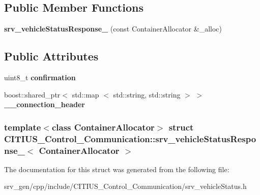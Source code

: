\subsection*{\-Public \-Member \-Functions}
\begin{DoxyCompactItemize}
\item 
\hypertarget{struct_c_i_t_i_u_s___control___communication_1_1srv__vehicle_status_response___a6d7b2470235ac1ef2182d25da1c1525e}{{\bfseries srv\-\_\-vehicle\-Status\-Response\-\_\-} (const \-Container\-Allocator \&\-\_\-alloc)}\label{struct_c_i_t_i_u_s___control___communication_1_1srv__vehicle_status_response___a6d7b2470235ac1ef2182d25da1c1525e}

\end{DoxyCompactItemize}
\subsection*{\-Public \-Attributes}
\begin{DoxyCompactItemize}
\item 
\hypertarget{struct_c_i_t_i_u_s___control___communication_1_1srv__vehicle_status_response___ae526b2adc755a8201ba4b022d015dd68}{uint8\-\_\-t {\bfseries confirmation}}\label{struct_c_i_t_i_u_s___control___communication_1_1srv__vehicle_status_response___ae526b2adc755a8201ba4b022d015dd68}

\item 
\hypertarget{struct_c_i_t_i_u_s___control___communication_1_1srv__vehicle_status_response___a3a7188e30c5cf5e28bfe2b84869b86b6}{boost\-::shared\-\_\-ptr$<$ std\-::map\*
$<$ std\-::string, std\-::string $>$ $>$ {\bfseries \-\_\-\-\_\-connection\-\_\-header}}\label{struct_c_i_t_i_u_s___control___communication_1_1srv__vehicle_status_response___a3a7188e30c5cf5e28bfe2b84869b86b6}

\end{DoxyCompactItemize}
\subsubsection*{template$<$class Container\-Allocator$>$ struct C\-I\-T\-I\-U\-S\-\_\-\-Control\-\_\-\-Communication\-::srv\-\_\-vehicle\-Status\-Response\-\_\-$<$ Container\-Allocator $>$}



\-The documentation for this struct was generated from the following file\-:\begin{DoxyCompactItemize}
\item 
srv\-\_\-gen/cpp/include/\-C\-I\-T\-I\-U\-S\-\_\-\-Control\-\_\-\-Communication/srv\-\_\-vehicle\-Status.\-h\end{DoxyCompactItemize}
